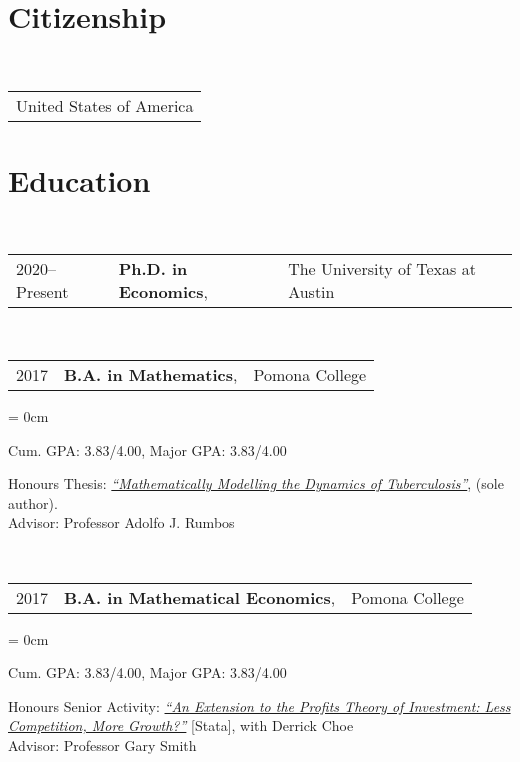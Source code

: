 \documentclass[a4paper, 11pt]{article}
\begin{document}
    \maketitle
    \thispagestyle{firststyle}

    \section{Citizenship}
      ~\begin{tabular}{l}
        United States of America\\
      \end{tabular}

    \section{Education}
      ~\begin{tabular}{lll}
        2020--Present & \textbf{Ph.D. in Economics}, & The University of Texas at Austin\\
      \end{tabular}
      
    \vspace*{1em}
      
      ~\begin{tabular}{lll}
        2017 & \textbf{B.A. in Mathematics}, & Pomona College\\
      \end{tabular}

    \begin{compactitem}\parskip = 0cm
      \item Cum. GPA: 3.83/4.00, Major GPA: 3.83/4.00\\
      \item Honours Thesis: \textit{\href{https://drive.google.com/file/d/0B1o_SCwTPL6TaEZuZ0ZBdXhlRms/view?usp=sharing}{``Mathematically Modelling the Dynamics of Tuberculosis''}}, (sole author).\\
      Advisor: Professor Adolfo J. Rumbos
    \end{compactitem}

    \vspace*{1em}

    ~\begin{tabular}{lll}
      2017 & \textbf{B.A. in Mathematical Economics}, & Pomona College\\
    \end{tabular}

    \begin{compactitem}\parskip = 0cm
      \item Cum. GPA: 3.83/4.00, Major GPA: 3.83/4.00\\
      \item Honours Senior Activity: \textit{\href{https://drive.google.com/file/d/0B1o_SCwTPL6TRzI3clFtbGdiVk0/view?usp=sharing}{``An Extension to the Profits Theory of Investment: Less Competition, More Growth?''}} {[Stata]}, with Derrick Choe\\
      Advisor: Professor Gary Smith
    \end{compactitem}
\end{document}
